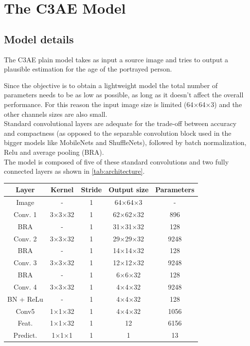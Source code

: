 
\chapter{The C3AE Model}
\label{chp:theorystuff}

\section{Model details}

The C3AE plain model takes as input a source image and tries to output a plausible estimation for the 
age of the portrayed person.

Since the objective is to obtain a lightweight model the total number of parameters needs to be as low 
as possible, as long as it doesn't affect the overall performance. 
For this reason the input image size is limited (64×64×3) and the other channels sizes are also small.\\
Standard convolutional layers are adequate for the trade-off between accuracy and compactness (as 
opposed to the separable convolution block used in the bigger models like MobileNets and ShuffleNets), 
followed by batch normalization, Relu and average pooling (BRA).\\
The model is composed of five of these standard convolutions and two fully connected layers as shown 
in \autoref{tab:architecture}.

\begin{center}
    \begin{tabular}{||c | c c c c||} 
    \hline
    Layer & Kernel & Stride & Output size & Parameters \\ 
    \hline\hline
    Image & - & 1 & 64×64×3 & - \\
    \hline
    Conv. 1 & 3×3×32 & 1 & 62×62×32 & 896 \\
    \hline
    BRA & - & 1 & 31×31×32 & 128 \\
    \hline
    Conv. 2 & 3×3×32 & 1 & 29×29×32 & 9248 \\
    \hline
    BRA & - & 1 & 14×14×32 & 128 \\ 
    \hline
    Conv. 3 & 3×3×32 & 1 & 12×12×32 & 9248 \\ 
    \hline
    BRA & - & 1 & 6×6×32 & 128 \\ 
    \hline
    Conv. 4 & 3×3×32 & 1 & 4×4×32 & 9248 \\ 
    \hline
    BN + ReLu & - & 1 & 4×4×32 & 128 \\ 
    \hline
    Conv5 & 1×1×32 & 1 & 4×4×32 & 1056 \\ 
    \hline
    Feat. & 1×1×32 & 1 & 12 & 6156 \\ 
    \hline
    Predict. & 1×1×1 & 1 & 1 & 13 \\ 
    \hline
    \end{tabular}
    \label{tab:architecture}
\end{center}

